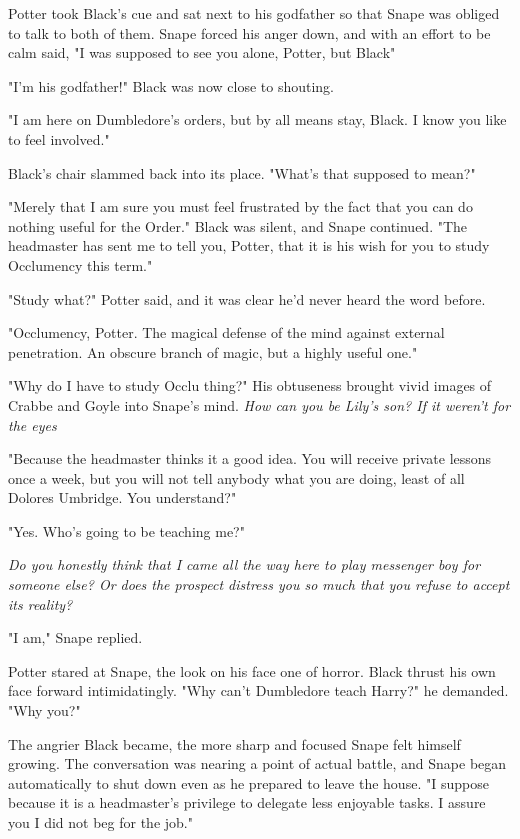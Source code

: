 Potter took Black's cue and sat next to his godfather so that Snape was obliged to talk to both of them. Snape forced his anger down, and with an effort to be calm said, "I was supposed to see you alone, Potter, but Black{\el}"

"I'm his godfather!" Black was now close to shouting.

"I am here on Dumbledore's orders, but by all means stay, Black. I know you like to feel{\el} involved."

Black's chair slammed back into its place. "What's that supposed to mean?"

"Merely that I am sure you must feel{\el} frustrated by the fact that you can do nothing useful for the Order." Black was silent, and Snape continued. "The headmaster has sent me to tell you, Potter, that it is his wish for you to study Occlumency this term."

"Study what?" Potter said, and it was clear he'd never heard the word before.

"Occlumency, Potter. The magical defense of the mind against external penetration. An obscure branch of magic, but a highly useful one."

"Why do I have to study Occlu{\el} thing?" His obtuseness brought vivid images of Crabbe and Goyle into Snape's mind. \emph{How can you be Lily's son? If it weren't for the eyes{\el}}

"Because the headmaster thinks it a good idea. You will receive private lessons once a week, but you will not tell anybody what you are doing, least of all Dolores Umbridge. You understand?"

"Yes. Who's going to be teaching me?"

\emph{Do you honestly think that I came all the way here to play messenger boy for someone else? Or does the prospect distress you so much that you refuse to accept its reality?}

"I am," Snape replied.

Potter stared at Snape, the look on his face one of horror. Black thrust his own face forward intimidatingly. "Why can't Dumbledore teach Harry?" he demanded. "Why you?"

The angrier Black became, the more sharp and focused Snape felt himself growing. The conversation was nearing a point of actual battle, and Snape began automatically to shut down even as he prepared to leave the house. "I suppose because it is a headmaster's privilege to delegate less enjoyable tasks. I assure you I did not beg for the job."

